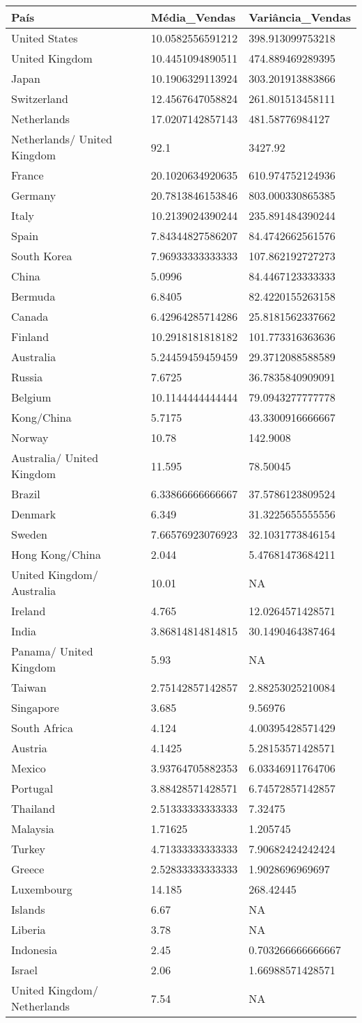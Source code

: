 \documentclass[
]{article}
\begin{document}
\begin{longtable}[]{@{}lll@{}}
\toprule
País & Média\_Vendas & Variância\_Vendas\tabularnewline
\midrule
\endhead
United States & 10.0582556591212 & 398.913099753218\tabularnewline
United Kingdom & 10.4451094890511 & 474.889469289395\tabularnewline
Japan & 10.1906329113924 & 303.201913883866\tabularnewline
Switzerland & 12.4567647058824 & 261.801513458111\tabularnewline
Netherlands & 17.0207142857143 & 481.58776984127\tabularnewline
Netherlands/ United Kingdom & 92.1 & 3427.92\tabularnewline
France & 20.1020634920635 & 610.974752124936\tabularnewline
Germany & 20.7813846153846 & 803.000330865385\tabularnewline
Italy & 10.2139024390244 & 235.891484390244\tabularnewline
Spain & 7.84344827586207 & 84.4742662561576\tabularnewline
South Korea & 7.96933333333333 & 107.862192727273\tabularnewline
China & 5.0996 & 84.4467123333333\tabularnewline
Bermuda & 6.8405 & 82.4220155263158\tabularnewline
Canada & 6.42964285714286 & 25.8181562337662\tabularnewline
Finland & 10.2918181818182 & 101.773316363636\tabularnewline
Australia & 5.24459459459459 & 29.3712088588589\tabularnewline
Russia & 7.6725 & 36.7835840909091\tabularnewline
Belgium & 10.1144444444444 & 79.0943277777778\tabularnewline
Kong/China & 5.7175 & 43.3300916666667\tabularnewline
Norway & 10.78 & 142.9008\tabularnewline
Australia/ United Kingdom & 11.595 & 78.50045\tabularnewline
Brazil & 6.33866666666667 & 37.5786123809524\tabularnewline
Denmark & 6.349 & 31.3225655555556\tabularnewline
Sweden & 7.66576923076923 & 32.1031773846154\tabularnewline
Hong Kong/China & 2.044 & 5.47681473684211\tabularnewline
United Kingdom/ Australia & 10.01 & NA\tabularnewline
Ireland & 4.765 & 12.0264571428571\tabularnewline
India & 3.86814814814815 & 30.1490464387464\tabularnewline
Panama/ United Kingdom & 5.93 & NA\tabularnewline
Taiwan & 2.75142857142857 & 2.88253025210084\tabularnewline
Singapore & 3.685 & 9.56976\tabularnewline
South Africa & 4.124 & 4.00395428571429\tabularnewline
Austria & 4.1425 & 5.28153571428571\tabularnewline
Mexico & 3.93764705882353 & 6.03346911764706\tabularnewline
Portugal & 3.88428571428571 & 6.74572857142857\tabularnewline
Thailand & 2.51333333333333 & 7.32475\tabularnewline
Malaysia & 1.71625 & 1.205745\tabularnewline
Turkey & 4.71333333333333 & 7.90682424242424\tabularnewline
Greece & 2.52833333333333 & 1.9028696969697\tabularnewline
Luxembourg & 14.185 & 268.42445\tabularnewline
Islands & 6.67 & NA\tabularnewline
Liberia & 3.78 & NA\tabularnewline
Indonesia & 2.45 & 0.703266666666667\tabularnewline
Israel & 2.06 & 1.66988571428571\tabularnewline
United Kingdom/ Netherlands & 7.54 & NA\tabularnewline

\end{longtable}
\end{document}
